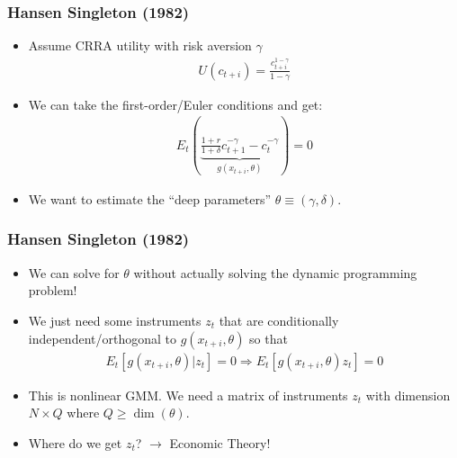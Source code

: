 \begin{frame}
\frametitle{Hansen Singleton (1982)}
\begin{itemize}
\item Assume CRRA utility with risk aversion $\gamma$
\begin{eqnarray*}
U(c_{t+i})  = \frac{c_{t+i}^{1-\gamma}}{1-\gamma}
\end{eqnarray*}
\item We can take the first-order/Euler conditions and get:
\begin{eqnarray*}
E_t \left(\underbrace{\frac{1+r}{1+\delta} c_{t+1}^{-\gamma} - c_{t}^{-\gamma}}_{g(x_{t+i},\theta)}\right) = 0
\end{eqnarray*}
\item We want to estimate the ``deep parameters'' $\theta \equiv (\gamma,\delta)$.
\end{itemize}
\end{frame}

\begin{frame}
\frametitle{Hansen Singleton (1982)}
\begin{itemize}
\item We can solve for $\theta$ without actually solving the dynamic programming problem!
\item We just need some instruments $z_t$ that are conditionally independent/orthogonal to $g(x_{t+i},\theta)$ so that
\begin{eqnarray*}
E_t [g(x_{t+i},\theta) | z_t] = 0 \Rightarrow E_t [g(x_{t+i},\theta)  z_t] = 0 
\end{eqnarray*}
\item This is \alert{nonlinear GMM}. We need a matrix of instruments $z_t$ with dimension $N \times Q$ where $Q \geq \dim(\theta)$.
\item Where do we get $z_t$? $\rightarrow$ Economic Theory!
\end{itemize}
\end{frame}


